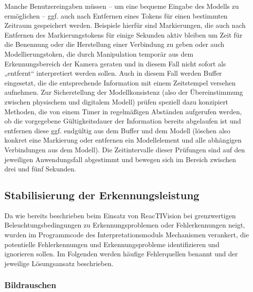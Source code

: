 Manche Benutzereingaben müssen -- um eine bequeme Eingabe des Modells zu ermöglichen -- ggf. auch nach Entfernen eines Tokens für einen bestimmten Zeitraum gespeichert werden. Beispiele hierfür sind Markierungen, die auch nach Entfernen des Markierungstokens für einige Sekunden aktiv bleiben um Zeit für die Benennung oder die Herstellung einer Verbindung zu geben oder auch Modellierungstoken, die durch Manipulation temporär aus dem Erkennungsbereich der Kamera geraten und in diesem Fall nicht sofort als „entfernt“ interpretiert werden sollen. Auch in diesem Fall werden Buffer eingesetzt, die die entsprechende Information mit einem Zeitstempel versehen aufnehmen. Zur Sicherstellung der Modellkonsistenz (also der Übereinstimmung zwischen physischem und digitalem Modell) prüfen speziell dazu konzipiert Methoden, die von einem Timer in regelmäßigen Abständen aufgerufen werden, ob die vorgegebene Gültigkeitsdauer der Information bereits abgelaufen ist und entfernen diese ggf. endgültig aus dem Buffer und dem Modell (löschen also konkret eine Markierung oder entfernen ein Modellelement und alle abhängigen Verbindungen aus dem Modell). Die Zeitintervalle dieser Prüfungen sind auf den jeweiligen Anwendungsfall abgestimmt und bewegen sich im Bereich zwischen drei und fünf Sekunden.


\subsection{Stabilisierung der Erkennungsleistung} %
\label{sub:stabilisierung_der_erkennungsleistung}

Da wie bereits beschrieben beim Einsatz von ReacTIVision bei grenzwertigen Beleuchtungsbedingungen zu Erkennungsproblemen oder Fehlerkennungen neigt, wurden im Programmcode des Interpretationsmoduls Mechanismen verankert, die potentielle Fehlerkennungen und Erkennungsprobleme identifizieren und ignorieren sollen. Im Folgenden werden häufige Fehlerquellen benannt und der jeweilige Lösungsansatz beschrieben.

\subsubsection{Bildrauschen} %
\label{ssub:bildrauschen}

